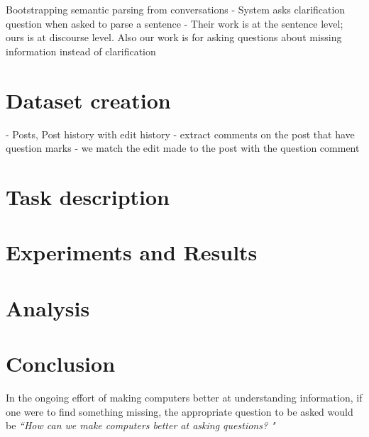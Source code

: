 \documentclass[11pt]{article}
\begin{document}
Bootstrapping semantic parsing from conversations
- System asks clarification question when asked to parse a sentence 
- Their work is at the sentence level; ours is at discourse level. Also our work is for asking questions about missing information instead of clarification


\section{Dataset creation}


- Posts, Post history with edit history
- extract comments on the post that have question marks
- we match the edit made to the post with the question comment 


\section{Task description}



\section{Experiments and Results}\label{experiments_results}

\section{Analysis}

\section{Conclusion}

In the ongoing effort of making computers better at understanding information, if one were to find something missing, the appropriate question to be asked would be \textit{``How can we make computers better at asking questions? "}

\fi


\end{document}
